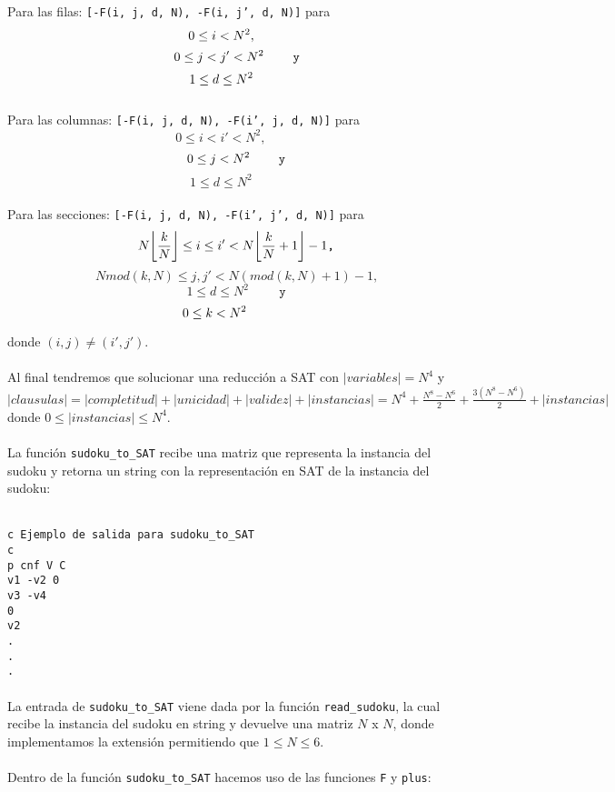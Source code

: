 \documentclass[letterpaper,12pt]{article}
\DeclarePairedDelimiter\floor{\lfloor}{\rfloor}
\begin{document}
Para las filas:
\texttt{[-F(i, j, d, N),  -F(i, j', d, N)]} para 
$$0 \leq i < N^2, \hspace{0.8cm}$$
$$\hspace{0.4mm} 0 \leq j < j'< N^2 \hspace{0.8cm} \texttt{y}$$ 
$$1 \leq d \leq N^2 \hspace{0.8cm}$$\\

Para las columnas:
\texttt{[-F(i, j, d, N),  -F(i', j, d, N)]} para 
$$0 \leq i < i'< N^2,\hspace{1cm}$$ 
$$0 \leq j < N^2 \hspace{0.8cm} \texttt{y}$$
$$1 \leq d \leq N^2\hspace{1cm}$$\\

Para las secciones:
\texttt{[-F(i, j, d, N),  -F(i', j', d, N)]} para 
\begin{equation*}
   N \floor*{\frac{k}{N}} \leq i \leq i' < N \floor*{\frac{k}{N}+1}-1 \texttt{,}
\end{equation*}
\begin{equation*}
   N mod(k,N) \leq j, j' < N (mod(k,N) + 1) - 1 \texttt{,}
\end{equation*}
$$1 \leq d \leq N^2 \hspace{1cm} \texttt{y}$$
$$0 \leq k < N^2 \hspace{1.2cm}$$

donde $(i,j) \neq (i',j')$.\\
\\
Al final tendremos que solucionar una reducción a SAT con $|variables|= N^4$ y $|clausulas|= |completitud| + |unicidad| + |validez| + |instancias| = N^4 + \frac{N^8 - N^6}{2} + \frac{3(N^8-N^6)}{2} + |instancias|$ donde
$ 0 \leq |instancias| \leq N^4$.\\
\\
La función \texttt{sudoku\_to\_SAT} recibe una matriz que representa la instancia del sudoku y retorna un string con la representación en SAT de la instancia del sudoku:

\texttt{\\
c Ejemplo de salida para sudoku\_to\_SAT\\
c \\
p cnf V C \\
v1 -v2 0\\
v3 -v4\\
0\\
v2\\
.\\
.\\
.\\}\\
La entrada de \texttt{sudoku\_to\_SAT} viene dada por la función \texttt{read\_sudoku}, la cual recibe la instancia del sudoku en string y devuelve una matriz $N$ x $N$, donde implementamos la extensión permitiendo que $1 \leq N \leq 6$.\\
\\
Dentro de la función \texttt{sudoku\_to\_SAT} hacemos uso de las funciones \texttt{F} y \texttt{plus}:\\
\end{document}
